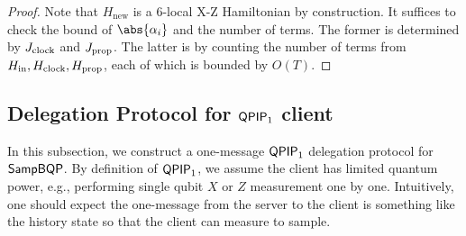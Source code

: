 \begin{proof}
Note that $H_{\mathrm{new}}$ is a 6-local X-Z Hamiltonian by construction. It suffices to check the bound of $\abs{\alpha_i}$ and the number of terms. The former is determined by $J_{\mathrm{clock}}$ and $J_{\mathrm{prop}}$. The latter is by counting the number of terms from $H_{\mathrm{in}}, H_{\mathrm{clock}}, H_{\mathrm{prop}}$, each of which is bounded by $O(T)$.
\end{proof}


\subsection{Delegation Protocol for $\operatorname{\mathsf{QPIP}}_1$ client}
\label{sec:qpip1}
In this subsection, we construct a one-message $\operatorname{\mathsf{QPIP}}_1$ delegation protocol for $\operatorname{\mathsf{SampBQP}}$. By definition of $\operatorname{\mathsf{QPIP}}_1$, we assume the client has limited quantum power, e.g., performing single qubit $X$ or $Z$ measurement one by one. 
Intuitively, one should expect the one-message from the server to the client is something like the history state so that the client can measure to sample.  

